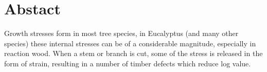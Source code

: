 \chapter{Abstact}
Growth stresses form in most tree species, in Eucalyptus (and many other
species) these internal stresses can be of a considerable magnitude, especially
in reaction wood. When a stem or branch is cut, some of the stress is released
in the form of strain, resulting in a number of timber defects which reduce log
value.
